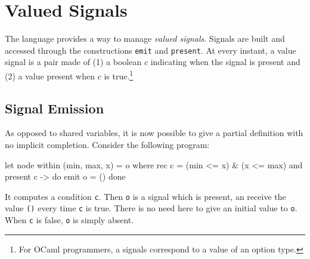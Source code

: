 \documentclass[11pt,titlepage,twoside]{report}
\newcommand{\ocaml}{{\sf OCaml}}
\begin{document}


\section{Valued Signals}
\label{signals}
The language provides a way to manage {\em valued signals}. Signals
are built and accessed through the constructions \verb-emit- and
\verb-present-.  At every instant, a value signal is a pair made of (1) a boolean
$c$ indicating when the signal is present and (2) a value present when $c$ is
true.\footnote{For \ocaml{} programmers, a signals correspond to a value
of an option type.}
 
\subsection{Signal Emission}
As opposed to shared variables, it is now possible to give a partial definition
with no implicit completion. Consider the following program:
\begin{runverbatim}[withresult]
let node within (min, max, x) = o where
  rec c = (min <= x) & (x <= max)
  and present c -> do emit o = () done
\end{runverbatim}
It computes a condition \verb-c-. Then \verb-o- is a signal
which is present, an receive the value \verb-()- every time \verb-c- is
true. There is no need here to give an initial value to \verb-o-. When \verb-c- is
false, \verb-o- is simply absent.
\end{document}
